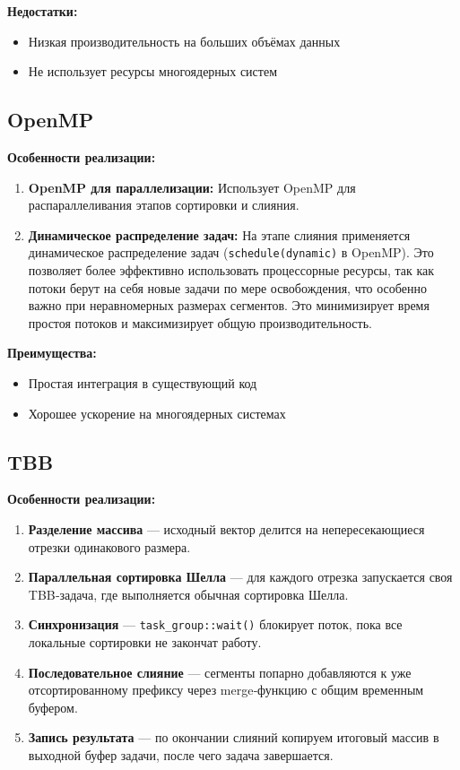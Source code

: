 \documentclass[a4paper,12pt]{article}
\begin{document}
\textbf{Недостатки:}
\begin{itemize}
  \item Низкая производительность на больших объёмах данных
  \item Не использует ресурсы многоядерных систем
\end{itemize}

\newpage

\subsection*{OpenMP}

\textbf{Особенности реализации:}
\begin{enumerate}
  \item \textbf{OpenMP для параллелизации:} Использует OpenMP для распараллеливания этапов сортировки и слияния.
  \item \textbf{Динамическое распределение задач:} На этапе слияния применяется динамическое распределение задач (\texttt{schedule(dynamic)} в OpenMP). Это позволяет более эффективно использовать процессорные ресурсы, так как потоки берут на себя новые задачи по мере освобождения, что особенно важно при неравномерных размерах сегментов. Это минимизирует время простоя потоков и максимизирует общую производительность.
\end{enumerate}
\textbf{Преимущества:}
\begin{itemize}
  \item Простая интеграция в существующий код
  \item Хорошее ускорение на многоядерных системах
\end{itemize}

\subsection*{TBB}

\textbf{Особенности реализации:}
\begin{enumerate}
  \item \textbf{Разделение массива} — исходный вектор делится на непересекающиеся отрезки одинакового размера.
  \item \textbf{Параллельная сортировка Шелла} — для каждого отрезка запускается своя TBB‑задача, где выполняется обычная сортировка Шелла.
  \item \textbf{Синхронизация} — \texttt{task\_group::wait()} блокирует поток, пока все локальные сортировки не закончат работу.
  \item \textbf{Последовательное слияние} — сегменты попарно добавляются к уже отсортированному префиксу через merge‑функцию с общим временным буфером.
  \item \textbf{Запись результата} — по окончании слияний копируем итоговый массив в выходной буфер задачи, после чего задача завершается.
\end{enumerate}
\end{document}
